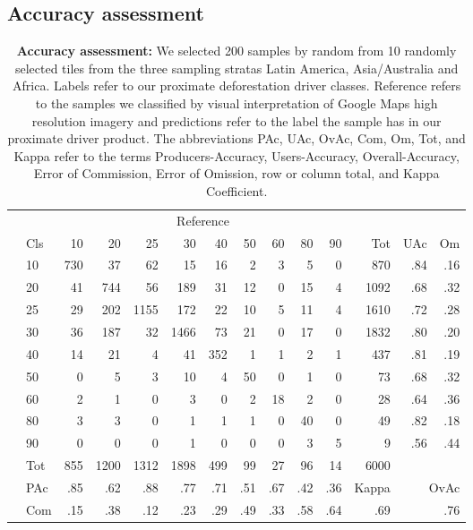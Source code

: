 		\subsection{Accuracy assessment}
		\label{subsec:results_accuracy_assessment}
			\begin{table}[ht]
				\centering
				\caption[Accuracy assessment]{\textbf{Accuracy assessment:} We selected 200 samples by random from 10 randomly selected tiles from the three sampling stratas Latin America, Asia/Australia and Africa. Labels refer to our proximate deforestation driver classes. Reference refers to the samples we classified by visual interpretation of Google Maps high resolution imagery and predictions refer to the label the sample has in our proximate driver product. The abbreviations PAc, UAc, OvAc, Com, Om, Tot, and Kappa refer to the terms Producers-Accuracy, Users-Accuracy, Overall-Accuracy, Error of Commission, Error of Omission, row or column total, and Kappa Coefficient.}
				\label{tab:results_confusion_matrix}
				\begin{tabular}{llrrrrrrrrrrrr}
					\hline
					& & \multicolumn{9}{c}{Reference} & & & \\\cline{3-11}
					& Cls & 10 & 20 & 25 & 30 & 40 & 50 & 60 & 80 & 90 & Tot & UAc & Om \\\hline
					\multirow{9}{*}{\STAB{\rotatebox[origin=c]{90}{Prediction}}}
					& 10 & 730 & 37 & 62 & 15 & 16 & 2 & 3 & 5 & 0 & 870 & .84 & .16 \\ 
					& 20 & 41 & 744 & 56 & 189 & 31 & 12 & 0 & 15 & 4 & 1092 & .68 & .32 \\ 
					& 25 & 29 & 202 & 1155 & 172 & 22 & 10 & 5 & 11 & 4 & 1610 & .72 & .28 \\ 
					& 30 & 36 & 187 & 32 & 1466 & 73 & 21 & 0 & 17 & 0 & 1832 & .80 & .20 \\ 
					& 40 & 14 & 21 & 4 & 41 & 352 & 1 & 1 & 2 & 1 & 437 & .81 & .19 \\ 
					& 50 & 0 & 5 & 3 & 10 & 4 & 50 & 0 & 1 & 0 & 73 & .68 & .32 \\ 
					& 60 & 2 & 1 & 0 & 3 & 0 & 2 & 18 & 2 & 0 & 28 & .64 & .36 \\ 
					& 80 & 3 & 3 & 0 & 1 & 1 & 1 & 0 & 40 & 0 & 49 & .82 & .18 \\ 
					& 90 & 0 & 0 & 0 & 1 & 0 & 0 & 0 & 3 & 5 & 9 & .56 & .44 \\\hline 
					& Tot & 855 & 1200 & 1312 & 1898 & 499 & 99 & 27 & 96 & 14 & 6000 & & \\
					& PAc & .85 & .62 & .88 & .77 & .71 & .51 & .67 & .42 & .36 & Kappa & \multicolumn{2}{r}{OvAc} \\
					& Com & .15 & .38 & .12 & .23 & .29 & .49 & .33 & .58 & .64 & .69 & \multicolumn{2}{r}{.76} \\ \hline
				\end{tabular}
			\end{table}
